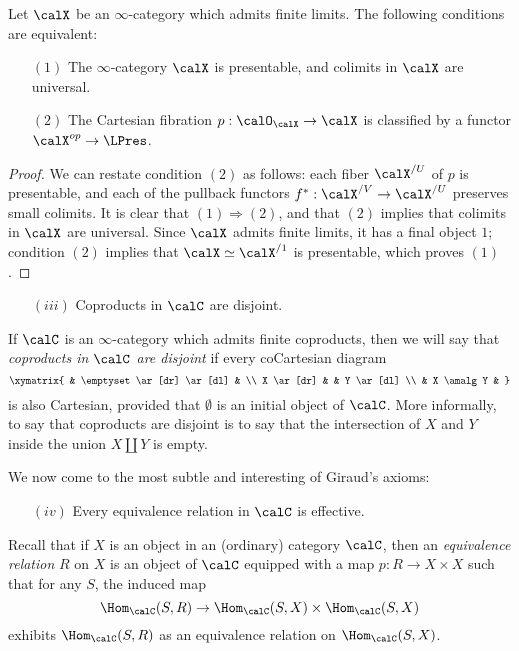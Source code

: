 \begin{proposition}\label{gentur}
Let $\calX$ be an $\infty$-category which admits finite limits. The following conditions are equivalent:
\begin{itemize}
\item[$(1)$] The $\infty$-category $\calX$ is presentable, and colimits in $\calX$ are universal.
\item[$(2)$] The Cartesian fibration $p: \calO_{\calX} \rightarrow \calX$ is classified by a functor
$\calX^{op} \rightarrow \LPres$.
\end{itemize}
\end{proposition}

\begin{proof}
We can restate condition $(2)$ as follows: each fiber $\calX^{/U}$ of $p$ is presentable, and
each of the pullback functors $f^{\ast}: \calX^{/V} \rightarrow \calX^{/U}$ preserves small colimits.
It is clear that $(1) \Rightarrow (2)$, and that $(2)$ implies that colimits in $\calX$ are universal.
Since $\calX$ admits finite limits, it has a final object $1$; condition $(2)$ implies that
$\calX \simeq \calX^{/1}$ is presentable, which proves $(1)$.
\end{proof}

\begin{itemize}
\item[$(iii)$] Coproducts in $\calC$ are disjoint.
\end{itemize}

If $\calC$ is an $\infty$-category which admits finite coproducts, then we will say that
{\it coproducts in $\calC$ are disjoint} if every coCartesian diagram
$$ \xymatrix{ & \emptyset \ar[dr] \ar[dl] & \\ X \ar[dr] & & Y \ar[dl] \\ & X \amalg Y & }$$
is also Cartesian, provided that $\emptyset$ is an initial object of $\calC$.
More informally, to say that coproducts are disjoint is to say that the intersection of $X$ and $Y$ inside the union $X \amalg Y$ is empty. 

We now come to the most subtle and interesting of Giraud's axioms:

\begin{itemize}
\item[$(iv)$] Every equivalence relation in $\calC$ is effective.
\end{itemize}
 
Recall that if $X$ is an object in an (ordinary) category $\calC$,
then an {\it equivalence relation} $R$ on $X$ is an object of
$\calC$ equipped with a map $p: R \rightarrow X \times X$ such
that for any $S$, the induced map $$\Hom_{\calC}(S,R) \rightarrow
\Hom_{\calC}(S,X) \times \Hom_{\calC}(S,X)$$ exhibits
$\Hom_{\calC}(S,R)$ as an equivalence relation on
$\Hom_{\calC}(S,X)$.

